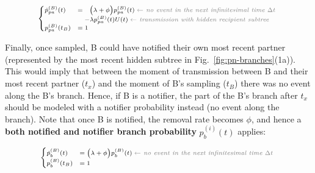 \documentclass[10pt,letterpaper]{article}
\begin{document}
\begin{equation}
\scriptsize
\begin{cases}
\dot{p}_{pa}^{(B)}(t) &=~~  \Big(\lambda + \phi\Big) p_{pa}^{(B)}(t)\; \textit{\color{gray} $\leftarrow$ no event in the next infinitesimal time $\Delta t$ }\\
    &~~~ - \lambda p_{pa}^{(B)}(t)U(t)\;  \textit{\color{gray} $\leftarrow$ transmission with hidden recipient subtree}\\
p_{pa}^{(B)}(t_B) &=  1\label{eq:p-pa}
\end{cases}
\end{equation}

Finally, once sampled, B could have notified their own most recent partner (represented by the most recent hidden subtree in Fig.~\ref{fig:pn-branches}(1a)). This would imply that between the moment of transmission between B and their most recent partner ($t_x$) and the moment of B's sampling ($t_B$) there was no event along the B's branch. Hence, if B is a notifier, the part of the B's branch after $t_x$ should be modeled with a notifier probability instead (no event along the branch). 
Note that once B is notified, the removal rate becomes $\phi$, and hence a \textbf{both notified and notifier branch probability} $p_b^{(i)}(t)$ applies:

\begin{equation}
\scriptsize
\begin{cases}
\dot{p}_b^{(B)}(t) &=  \Big(\lambda + \phi\Big) p_b^{(B)}(t)\; \textit{\color{gray} $\leftarrow$ no event in the next infinitesimal time $\Delta t$ }\\
p_b^{(B)}(t_B) &= 1\label{eq:p-b}
\end{cases}
\end{equation}
\end{document}
